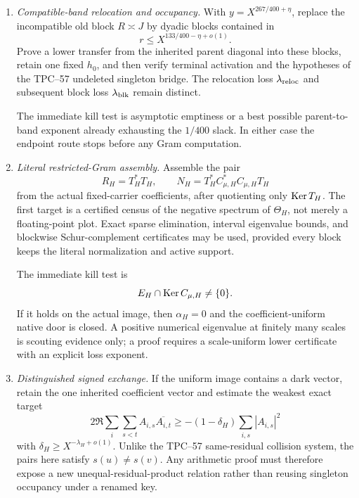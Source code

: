 \begin{enumerate}[label=\textbf{Door \Alph*.},leftmargin=3.8em]
 \item \emph{Compatible-band relocation and occupancy.}
       With \(y=X^{267/400+\eta}\), replace the incompatible old block
       \(R\asymp J\) by dyadic blocks contained in
       \[
        r\le X^{133/400-\eta+o(1)}.
       \]
       Prove a lower transfer from the inherited parent diagonal into these
       blocks, retain one fixed \(h_0\), and then verify terminal activation
       and the hypotheses of the TPC--57 undeleted singleton bridge.  The
       relocation loss \(\lambda_{\rm reloc}\) and subsequent block loss
       \(\lambda_{\rm blk}\) remain distinct.

       The immediate kill test is asymptotic emptiness or a best possible
       parent-to-band exponent already exhausting the \(1/400\) slack.  In
       either case the endpoint route stops before any Gram computation.

 \item \emph{Literal restricted-Gram assembly.}
       Assemble the pair
       \[
        R_H=T_H^*T_H,
        \qquad
        N_H=T_H^*C_{\mu,H}^*C_{\mu,H}T_H
       \]
       from the actual fixed-carrier coefficients, after quotienting only
       \(\operatorname{Ker} T_H\).  The first target is a certified census of the negative
       spectrum of \(\Theta_H\), not merely a floating-point plot.  Exact
       sparse elimination, interval eigenvalue bounds, and blockwise
       Schur-complement certificates may be used, provided every block keeps
       the literal normalization and active support.

       The immediate kill test is
       \[
        E_H\cap\operatorname{Ker} C_{\mu,H}\ne\{0\}.
       \]
       If it holds on the actual image, then \(\alpha_H=0\) and the
       coefficient-uniform native door is closed.  A positive numerical
       eigenvalue at finitely many scales is scouting evidence only; a proof
       requires a scale-uniform lower certificate with an explicit loss
       exponent.

 \item \emph{Distinguished signed exchange.}
       If the uniform image contains a dark vector, retain the one inherited
       coefficient vector and estimate the weakest exact target
       \begin{equation}
        2\Re\sum_i\sum_{s<t}A_{i,s}\overline{A_{i,t}}
        \ge -(1-\delta_H)\sum_{i,s}|A_{i,s}|^2
        \label{eq:tpc58-next-distinguished-exchange}
       \end{equation}
       with \(\delta_H\ge X^{-\lambda_H+o(1)}\).  Unlike the TPC--57
       same-residual collision system, the pairs here satisfy
       \(s(u)\ne s(v)\).  Any arithmetic proof must therefore expose a new
       unequal-residual-product relation rather than reusing singleton
       occupancy under a renamed key.


\end{enumerate}
